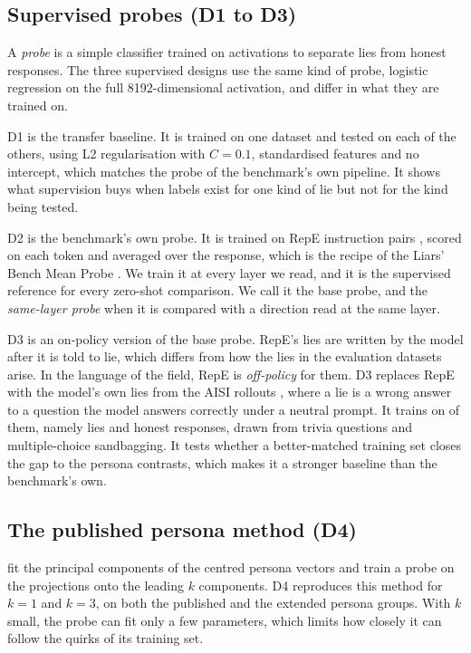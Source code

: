 \subsection{Supervised probes (D1 to D3)}
\label{sec:probes}

A \emph{probe} is a simple classifier trained on activations to separate lies from honest
responses. The three supervised designs use the same kind of probe, logistic regression on the full
8192-dimensional activation, and differ in what they are trained on.

D1 is the transfer baseline. It is trained on one dataset and tested on each of the others, using
L2 regularisation with $C = 0.1$, standardised features and no intercept, which matches the probe
of the benchmark's own pipeline. It shows what supervision buys when labels exist for one kind of
lie but not for the kind being tested.

D2 is the benchmark's own probe. It is trained on RepE instruction pairs
\cite{zou2023representation}, scored on each token and averaged over the response, which is the
recipe of the Liars' Bench Mean Probe \cite{kretschmar2025liars}. We train it at every layer we read,
and it is the supervised reference for every zero-shot comparison. We call it the base probe, and
the \emph{same-layer probe} when it is compared with a direction read at the same layer.

D3 is an on-policy version of the base probe. RepE's lies are written by the model after it is told
to lie, which differs from how the lies in the evaluation datasets arise. In the language of the
field, RepE is \emph{off-policy} for them. D3 replaces RepE with the model's own lies from the AISI
rollouts \cite{aisi_lie_rollouts}, where a lie is a wrong answer to a question the model answers
correctly under a neutral prompt. It trains on  of them, namely
 lies and  honest responses, drawn from trivia
questions and multiple-choice sandbagging. It tests whether a better-matched training set closes the
gap to the persona contrasts, which makes it a stronger baseline than the benchmark's own.

\subsection{The published persona method (D4)}

\textcite{mahadik2026persona} fit the principal components of the centred persona vectors and train
a probe on the projections onto the leading $k$ components. D4 reproduces this method for $k = 1$
and $k = 3$, on both the published and the extended persona groups. With $k$ small, the probe can
fit only a few parameters, which limits how closely it can follow the quirks of its training set.

